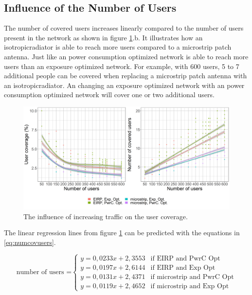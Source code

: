 \FloatBarrier
\subsection{Influence of the Number of Users}
\label{s2b}

The number of covered users increases linearly compared to the number of users present in the network as shown in figure 
\ref{fig:s2uvsnumcovusers}.b. It illustrates how an \gls{isotropicradiator} is able to reach more users 
compared to a microstrip patch antenna. Just like an power consumption optimized network 
is able to reach more users than an exposure optimized network.
For example, with 600 users, 5 to 7 additional 
people can be covered when replacing a microstrip patch antenna with an \gls{isotropicradiator}.
An changing an exposure optimized network with an power consumption optimized network will 
cover one or two additional users.

\begin{figure}[h!]
  \includegraphics[width=\textwidth]{../results/s2/uvsnumdronesAndCov.png}
  \caption{The influence of increasing traffic on the user coverage.}
  \label{fig:s2uvsnumcovusers}
\end{figure}

The linear regression lines from figure \ref{fig:s2uvsnumcovusers} can be predicted with the equations in \ref{eq:numcovusers}.

\begin{equation}
\text{number of users =}
    \begin{cases}
      y = 0,0233x + 2,3553 & \text{if EIRP and PwrC Opt}\\
      y = 0,0197x + 2,6144  & \text{if EIRP and Exp Opt}\\
      y = 0,0131x + 2,4371  & \text{if microstrip and PwrC Opt}\\
      y = 0,0119x + 2,4652  & \text{if microstrip and Exp Opt}
    \end{cases} 
    \label{eq:numcovusers}      
\end{equation}

